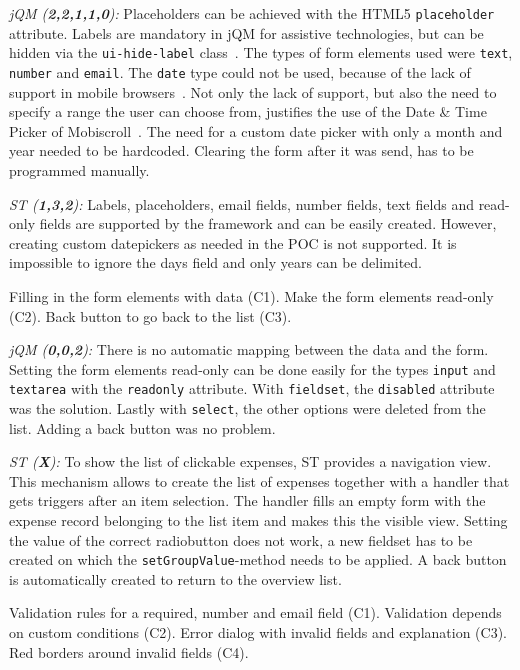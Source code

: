 \documentclass[a4paper]{artikel3}
\newcommand{\code}[1]{\texttt{#1}}
\renewcommand{\paragraph}[1]{\vspace{2mm} \noindent {\bf #1}  }
\newcommand{\framework}[2]{ \emph{#1 (\textbf{#2}): }} %
\newcommand{\challenge}[1]{\paragraph{#1}}
\begin{document}
\framework{jQM}{2,2,1,1,0}
Placeholders can be achieved with the HTML5 \code{placeholder} attribute.
Labels are mandatory in jQM for assistive technologies, but can be hidden via the \code{ui-hide-label} class~\cite{JQuery2013}. 
The types of form elements used were \code{text}, \code{number} and \code{email}.
The \code{date} type could not be used, because of the lack of support in mobile browsers~\cite{Deveria2013b}.
Not only the lack of support, but also the need to specify a range the user can choose from, justifies the use of the Date \& Time Picker of Mobiscroll~\cite{Mobiscroll2013}.
The need for a custom date picker with only a month and year needed to be hardcoded.
Clearing the form after it was send, has to be programmed manually.

\framework{ST}{1,3,2}
Labels,  placeholders,  email fields, number fields, text fields and read-only fields are supported by the framework and can be easily created.  However, creating custom datepickers as needed in the POC is not supported.  It is impossible to ignore the days field and only years can be delimited.  

\challenge{Form filling (C1,C2,C3)}
Filling in the form elements with data (C1).
Make the form elements read-only (C2).
Back button to go back to the list (C3).

\framework{jQM}{0,0,2}
There is no automatic mapping between the data and the form.
Setting the form elements read-only can be done easily for the types \code{input} and \code{textarea} with the \code{readonly} attribute.
With \code{fieldset}, the \code{disabled} attribute was the solution.
Lastly with \code{select}, the other options were deleted from the list.
Adding a back button was no problem.

\framework{ST}{X}
To show the list of clickable expenses,  ST provides a navigation view.  This mechanism allows to create the list of expenses together with a handler that gets triggers after an item selection.  The handler fills an empty form with the expense record belonging to the list item and makes this the visible view.  Setting the value of the correct radiobutton does not work,  a new fieldset has to be created on which the \code{setGroupValue}-method needs to be applied.  A back button is automatically created to return to the overview list.

\challenge{Form validation (C1,C2,C3,C4)}
Validation rules for a required, number and email field (C1).
Validation depends on custom conditions (C2).
Error dialog with invalid fields and explanation (C3).
Red borders around invalid fields (C4).
\end{document}
